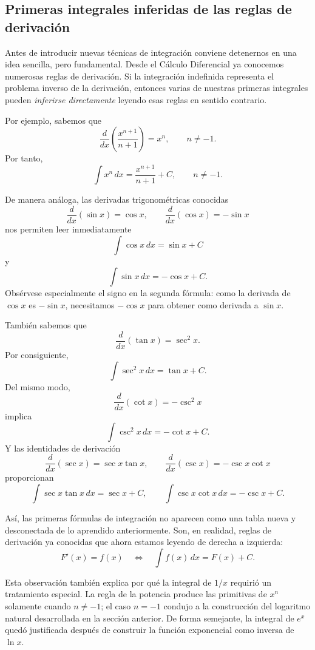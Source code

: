 \documentclass[12pt]{article}
\theoremstyle{definition}
\theoremstyle{remark}
\begin{document}
\subsection*{Primeras integrales inferidas de las reglas de derivación}
Antes de introducir nuevas técnicas de integración conviene detenernos en una idea sencilla, pero fundamental. Desde el Cálculo Diferencial ya conocemos numerosas reglas de derivación. Si la integración indefinida representa el problema inverso de la derivación, entonces varias de nuestras primeras integrales pueden \emph{inferirse directamente} leyendo esas reglas en sentido contrario.

Por ejemplo, sabemos que
\[
\frac{d}{dx}\left(\frac{x^{n+1}}{n+1}\right)=x^n,
\qquad n\neq -1.
\]
Por tanto,
\[
\boxed{\int x^n\,dx=\frac{x^{n+1}}{n+1}+C,\qquad n\neq-1.}
\]

De manera análoga, las derivadas trigonométricas conocidas
\[
\frac{d}{dx}(\sin x)=\cos x,
\qquad
\frac{d}{dx}(\cos x)=-\sin x
\]
nos permiten leer inmediatamente
\[
\boxed{\int\cos x\,dx=\sin x+C}
\]
y
\[
\boxed{\int\sin x\,dx=-\cos x+C.}
\]
Obsérvese especialmente el signo en la segunda fórmula: como la derivada de $\cos x$ es $-\sin x$, necesitamos $-\cos x$ para obtener como derivada a $\sin x$.

También sabemos que
\[
\frac{d}{dx}(\tan x)=\sec^2x.
\]
Por consiguiente,
\[
\boxed{\int\sec^2x\,dx=\tan x+C.}
\]
Del mismo modo,
\[
\frac{d}{dx}(\cot x)=-\csc^2x
\]
implica
\[
\boxed{\int\csc^2x\,dx=-\cot x+C.}
\]
Y las identidades de derivación
\[
\frac{d}{dx}(\sec x)=\sec x\tan x,
\qquad
\frac{d}{dx}(\csc x)=-\csc x\cot x
\]
proporcionan
\[
\boxed{\int\sec x\tan x\,dx=\sec x+C,}
\qquad
\boxed{\int\csc x\cot x\,dx=-\csc x+C.}
\]

Así, las primeras fórmulas de integración no aparecen como una tabla nueva y desconectada de lo aprendido anteriormente. Son, en realidad, reglas de derivación ya conocidas que ahora estamos leyendo de derecha a izquierda:
\[
\boxed{F'(x)=f(x)\quad\Longleftrightarrow\quad \int f(x)\,dx=F(x)+C.}
\]

Esta observación también explica por qué la integral de $1/x$ requirió un tratamiento especial. La regla de la potencia produce las primitivas de $x^n$ solamente cuando $n\neq-1$; el caso $n=-1$ condujo a la construcción del logaritmo natural desarrollada en la sección anterior. De forma semejante, la integral de $e^x$ quedó justificada después de construir la función exponencial como inversa de $\ln x$.
\end{document}
